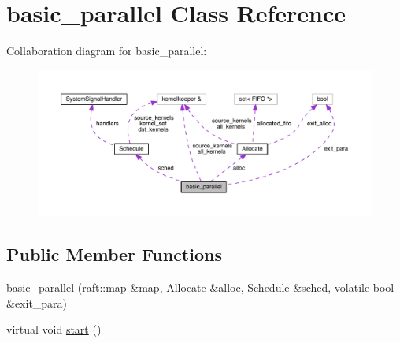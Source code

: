 \hypertarget{classbasic__parallel}{}\section{basic\+\_\+parallel Class Reference}
\label{classbasic__parallel}


Collaboration diagram for basic\+\_\+parallel\+:
\nopagebreak
\begin{figure}[H]
\begin{center}
\leavevmode
\includegraphics[width=350pt]{classbasic__parallel__coll__graph}
\end{center}
\end{figure}
\subsection*{Public Member Functions}
\begin{DoxyCompactItemize}
\item 
\hyperlink{classbasic__parallel_a8c444469221caca20b1b04762636df78}{basic\+\_\+parallel} (\hyperlink{classraft_1_1map}{raft\+::map} \&map, \hyperlink{class_allocate}{Allocate} \&alloc, \hyperlink{class_schedule}{Schedule} \&sched, volatile bool \&exit\+\_\+para)
\item 
virtual void \hyperlink{classbasic__parallel_a85ea2560d40ad50482468e39d626a52b}{start} ()
\end{DoxyCompactItemize}
